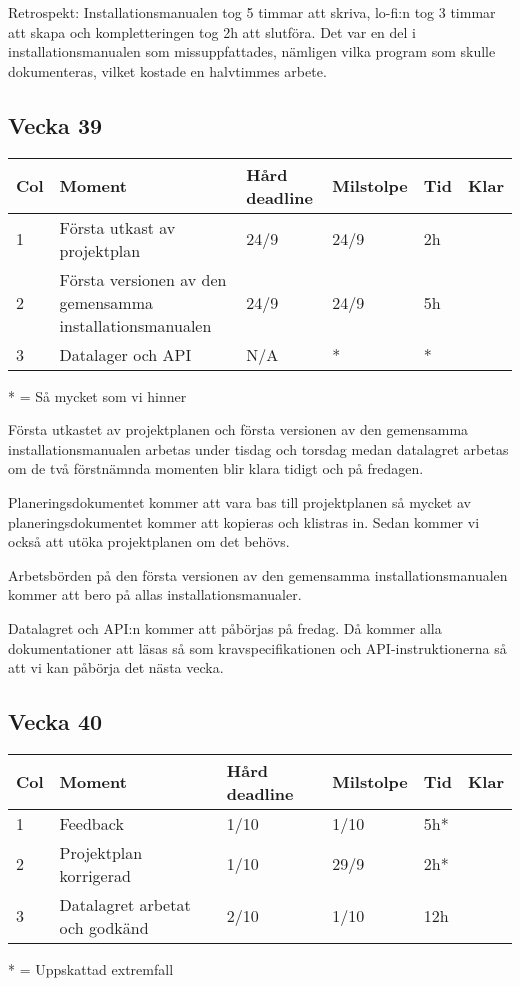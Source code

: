 \documentclass{TDP003mall}
\begin{document}
Retrospekt: Installationsmanualen tog 5 timmar att skriva, lo-fi:n tog 3 timmar  att skapa och kompletteringen tog 2h att slutföra. Det var en del i installationsmanualen som missuppfattades, nämligen vilka program som skulle dokumenteras, vilket kostade en halvtimmes arbete.

\subsection*{Vecka 39}
\begin{table}[!h]
\begin{tabularx}{\linewidth}{|l|X|l|l|l|l|}
\hline
Col & Moment & Hård deadline & Milstolpe & Tid & Klar \\\hline
1 & Första utkast av projektplan & 24/9 & 24/9 & 2h \\\hline
2 & Första versionen av den gemensamma installationsmanualen & 24/9 & 24/9 & 5h \\\hline
3 & Datalager och API & N/A & * & *\\\hline
\end{tabularx}
\end{table}
* = Så mycket som vi hinner

Första utkastet av projektplanen och första versionen av den gemensamma installationsmanualen arbetas under tisdag och torsdag medan datalagret arbetas om de två förstnämnda momenten blir klara tidigt och på fredagen.

Planeringsdokumentet kommer att vara bas till projektplanen så mycket av planeringsdokumentet kommer att kopieras och klistras in. Sedan kommer vi också att utöka projektplanen om det behövs.

Arbetsbörden på den första versionen av den gemensamma installationsmanualen kommer att bero på allas installationsmanualer.

Datalagret och API:n kommer att påbörjas på fredag. Då kommer alla dokumentationer att läsas så som kravspecifikationen och API-instruktionerna så att vi kan påbörja det nästa vecka.

\subsection*{Vecka 40}
\begin{table}[!h]
\begin{tabularx}{\linewidth}{|l|X|l|l|l|l|}
\hline
Col & Moment & Hård deadline & Milstolpe & Tid & Klar \\\hline
1 & Feedback & 1/10 & 1/10 & 5h* \\\hline
2 & Projektplan korrigerad & 1/10 & 29/9 & 2h* \\\hline
3 & Datalagret arbetat och godkänd & 2/10 & 1/10 & 12h\\\hline
\end{tabularx}
\end{table}
* = Uppskattad extremfall
\end{document}
